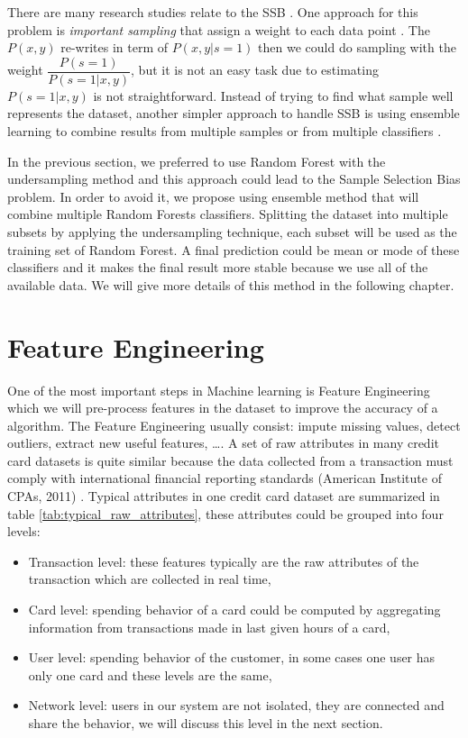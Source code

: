There are many research studies relate to the SSB \citep{elkan2001foundations, zadrozny2003cost, zadrozny2001learning, zadrozny2004learning, fan2005improved, dudik2006correcting}. One approach for this problem is \textit{important sampling} that assign a weight to each data point \citep{zadrozny2003cost, zadrozny2004learning, fan2005improved}. The $P(x,y)$ re-writes in term of $P(x, y|s = 1)$ then we could do sampling with the weight $\dfrac{ P(s = 1) }{ P(s = 1|x, y) }$, but it is not an easy task due to estimating $P(s = 1|x, y)$ is not straightforward. Instead of trying to find what sample well represents the dataset, another simpler approach to handle SSB is using ensemble learning to combine results from multiple samples or from multiple classifiers \citep{fan2007sample}.

In the previous section, we preferred to use Random Forest with the undersampling method and this approach could lead to the Sample Selection Bias problem. In order to avoid it, we propose using ensemble method that will combine multiple Random Forests classifiers. Splitting the dataset into multiple subsets by applying the undersampling technique, each subset will be used as the training set of Random Forest. A final prediction could be mean or mode of these classifiers and it makes the final result more stable because we use all of the available data. We will give more details of this method in the following chapter.


\section{Feature Engineering}
\label{feature_engineering}

One of the most important steps in Machine learning is Feature Engineering which we will pre-process features in the dataset to improve the accuracy of a algorithm. The Feature Engineering usually consist: impute missing values, detect outliers, extract new useful features, \dots. A set of raw attributes in many credit card datasets is quite similar because the data collected from a transaction must comply with international financial reporting standards (American Institute of CPAs, 2011) \citep{aicpa}. Typical attributes in one credit card dataset are summarized in table \ref{tab:typical_raw_attributes}, these attributes could be grouped into four levels:

\begin{itemize}
\item Transaction level: these features typically are the raw attributes of the transaction which are collected in real time,
\item Card level: spending behavior of a card could be computed by aggregating information from transactions made in last given hours of a card,
\item User level: spending behavior of the customer, in some cases one user has only one card and these levels are the same,
\item Network level: users in our system are not isolated, they are connected and share the behavior, we will discuss this level in the next section.
\end{itemize}


